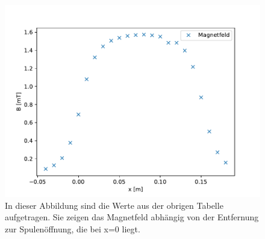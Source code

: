 \documentclass[titlepage = firstcover]{scrartcl}
\begin{document}
                \begin{figure}[h]
                    \centering
                    \includegraphics{Spulelang.pdf}
                    \caption{In dieser Abbildung sind die Werte aus der obrigen Tabelle aufgetragen. Sie zeigen das Magnetfeld abhängig von der Entfernung zur Spulenöffnung, die bei x=0 liegt.}
                    \label{fig:Spulelang}
    
                \end{figure}
    
                \FloatBarrier
                \newpage
    
    
\end{document}
